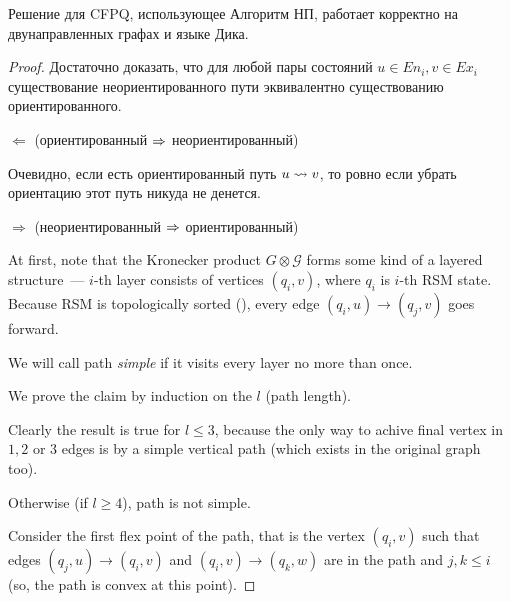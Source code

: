 \begin{theorem}
Решение для CFPQ, использующее Алгоритм НП, работает корректно на двунаправленных графах и языке Дика.
\end{theorem}
\begin{proof}

Достаточно доказать, что для любой пары состояний $u \in En_i, v \in Ex_i$ существование неориентированного пути эквивалентно существованию ориентированного.


$\Leftarrow$ (ориентированный $\Rightarrow$ неориентированный)

Очевидно, если есть ориентированный путь $u \rightsquigarrow v$, то ровно если убрать ориентацию этот путь никуда не денется.


$\Rightarrow$ (неориентированный $\Rightarrow$ ориентированный)


At first, note that the Kronecker product $G \otimes \mathcal{G}$ forms some kind of a layered structure~--- $i$-th layer consists of vertices $(q_i, v)$, where $q_i$ is $i$-th RSM state. Because RSM is topologically sorted ({\color{red}{TODO}}), every edge $(q_i, u) \rightarrow (q_j, v)$ goes forward.

We will call path \textit{simple} if it visits every layer no more than once.

We prove the claim by induction on the $l$ (path length).

Clearly the result is true for $l \le 3$, because the only way to achive final vertex in $1, 2$ or $3$ edges is by a simple vertical path (which exists in the original graph too).

Otherwise (if $l \ge 4$), path is not simple. 

Consider the first flex point of the path, that is the vertex $(q_i, v)$ such that edges $(q_j, u) \rightarrow (q_i, v)$ and $(q_i, v) \rightarrow (q_k, w)$ are in the path and $j, k \le i$ (so, the path is convex at this point).


\end{proof}
